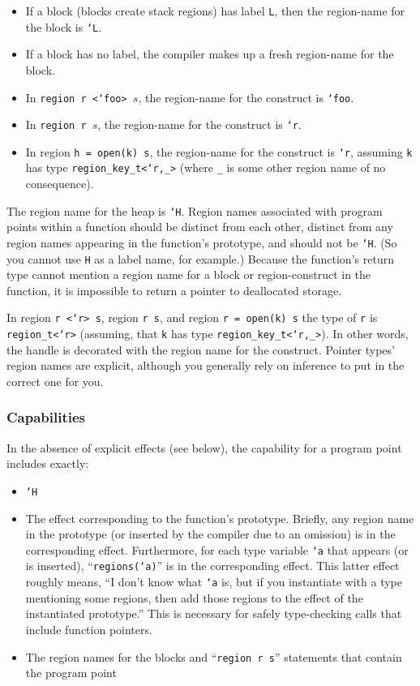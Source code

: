 \begin{itemize}
\item If a block (blocks create stack regions) has label \texttt{L},
  then the region-name for the block is \texttt{`L}.
\item If a block has no label, the compiler makes up a fresh
  region-name for the block.
\item In \texttt{region r <`foo> $s$}, the region-name for the construct
  is \texttt{`foo}.
\item In \texttt{region r $s$}, the region-name for the construct is
  \texttt{`r}.
\item In region \texttt{h = open(k) s}, the region-name for the construct is
  \texttt{`r}, assuming \texttt{k} has type \texttt{region\_key\_t<`r,\_>}
  (where \texttt{\_} is some other region name of no consequence).
\end{itemize}

The region name for the heap is \texttt{`H}. Region names associated
with program points within a function should be distinct from each
other, distinct from any region names appearing in the function's
prototype, and should not be \texttt{`H}.  (So you cannot use
\texttt{H} as a label name, for example.)  Because the function's
return type cannot mention a region name for a block or
region-construct in the function, it is impossible to return a pointer
to deallocated storage.

In region \texttt{r <`r> s}, region \texttt{r s}, and region \texttt{r =
open(k) s} the type of \texttt{r} is \texttt{region\_t<`r>} (assuming, that
\texttt{k} has type \texttt{region\_key\_t<`r,\_>}). In other words, the
handle is decorated with the region name for the construct.  Pointer types'
region names are explicit, although you generally rely on inference to put
in the correct one for you.

\subsubsection{Capabilities}

In the absence of explicit effects (see below), the capability for a
program point includes exactly:
\begin{itemize}
\item \texttt{`H}
\item The effect corresponding to the function's prototype.  Briefly,
any region name in the prototype (or inserted by the compiler due to
an omission) is in the corresponding effect.  Furthermore, for each
type variable \texttt{`a} that appears (or is inserted),
``\texttt{regions(`a)}'' is in the corresponding effect.  This latter
effect roughly means, ``I don't know what \texttt{`a} is, but if you
instantiate with a type mentioning some regions, then add those
regions to the effect of the instantiated prototype.''  This is
necessary for safely type-checking calls that include function pointers.
\item The region names for the blocks and ``\texttt{region r s}''
  statements that contain the program point
\end{itemize}


